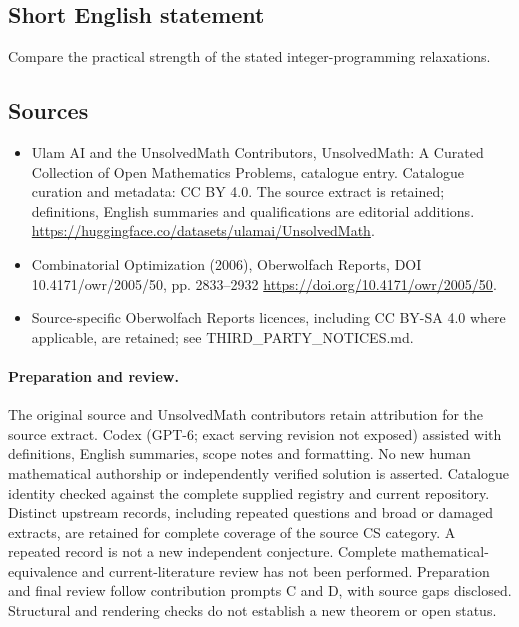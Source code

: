 \documentclass[11pt]{article}
\begin{document}
\subsection{Short English statement}
Compare the practical strength of the stated integer-programming relaxations.
\subsection{Sources}
\begin{itemize}
\item[\hypertarget{source:statement:1}{S1}] Ulam AI and the UnsolvedMath Contributors, UnsolvedMath: A Curated Collection of Open Mathematics Problems, catalogue entry. Catalogue curation and metadata: CC BY 4.0. The source extract is retained; definitions, English summaries and qualifications are editorial additions.
\url{https://huggingface.co/datasets/ulamai/UnsolvedMath}.
\item[\hypertarget{source:statement:2}{S2}] Combinatorial Optimization (2006), Oberwolfach Reports, DOI 10.4171/owr/2005/50, pp. 2833--2932
\url{https://doi.org/10.4171/owr/2005/50}.
\item Source-specific Oberwolfach Reports licences, including CC BY-SA 4.0 where applicable, are retained; see THIRD\_PARTY\_NOTICES.md.
\end{itemize}
\paragraph{Preparation and review.}
The original source and UnsolvedMath contributors retain attribution for the source extract. Codex (GPT-6; exact serving revision not exposed) assisted with definitions, English summaries, scope notes and formatting. No new human mathematical authorship or independently verified solution is asserted. Catalogue identity checked against the complete supplied registry and current repository. Distinct upstream records, including repeated questions and broad or damaged extracts, are retained for complete coverage of the source CS category. A repeated record is not a new independent conjecture. Complete mathematical-equivalence and current-literature review has not been performed. Preparation and final review follow contribution prompts C and D, with source gaps disclosed. Structural and rendering checks do not establish a new theorem or open status.
\label{end:statement}
\end{document}
